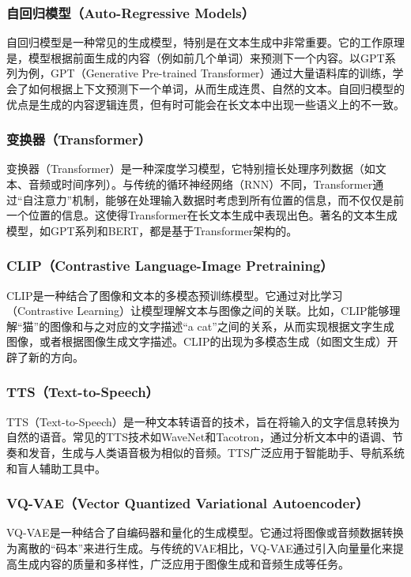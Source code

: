 \subsubsection*{自回归模型（Auto-Regressive Models）}
自回归模型是一种常见的生成模型，特别是在文本生成中非常重要。它的工作原理是，模型根据前面生成的内容（例如前几个单词）来预测下一个内容。以GPT系列为例，GPT（Generative Pre-trained Transformer）通过大量语料库的训练，学会了如何根据上下文预测下一个单词，从而生成连贯、自然的文本。自回归模型的优点是生成的内容逻辑连贯，但有时可能会在长文本中出现一些语义上的不一致。

\subsubsection*{变换器（Transformer）}
变换器（Transformer）是一种深度学习模型，它特别擅长处理序列数据（如文本、音频或时间序列）。与传统的循环神经网络（RNN）不同，Transformer通过“自注意力”机制，能够在处理输入数据时考虑到所有位置的信息，而不仅仅是前一个位置的信息。这使得Transformer在长文本生成中表现出色。著名的文本生成模型，如GPT系列和BERT，都是基于Transformer架构的。

\subsubsection*{CLIP（Contrastive Language-Image Pretraining）}
CLIP是一种结合了图像和文本的多模态预训练模型。它通过对比学习（Contrastive Learning）让模型理解文本与图像之间的关联。比如，CLIP能够理解“猫”的图像和与之对应的文字描述“a cat”之间的关系，从而实现根据文字生成图像，或者根据图像生成文字描述。CLIP的出现为多模态生成（如图文生成）开辟了新的方向。

\subsubsection*{TTS（Text-to-Speech）}
TTS（Text-to-Speech）是一种文本转语音的技术，旨在将输入的文字信息转换为自然的语音。常见的TTS技术如WaveNet和Tacotron，通过分析文本中的语调、节奏和发音，生成与人类语音极为相似的音频。TTS广泛应用于智能助手、导航系统和盲人辅助工具中。

\subsubsection*{VQ-VAE（Vector Quantized Variational Autoencoder）}
VQ-VAE是一种结合了自编码器和量化的生成模型。它通过将图像或音频数据转换为离散的“码本”来进行生成。与传统的VAE相比，VQ-VAE通过引入向量量化来提高生成内容的质量和多样性，广泛应用于图像生成和音频生成等任务。

